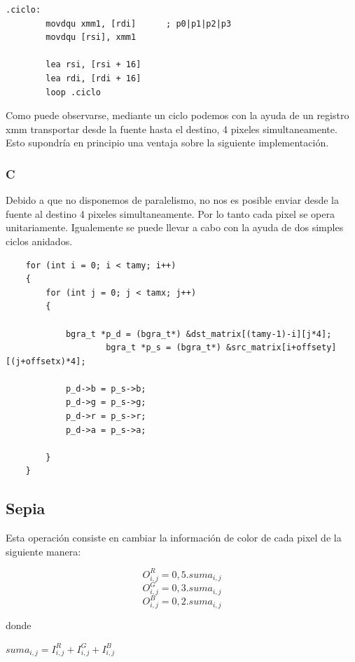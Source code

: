 \begin{codesnippet}
\begin{verbatim}
.ciclo:
        movdqu xmm1, [rdi]      ; p0|p1|p2|p3
        movdqu [rsi], xmm1
    
        lea rsi, [rsi + 16]
        lea rdi, [rdi + 16]
        loop .ciclo
\end{verbatim}
\end{codesnippet}

Como puede observarse, mediante un ciclo podemos con la ayuda de un registro xmm transportar desde la fuente hasta el destino, 4 pixeles simultaneamente. Esto supondría en principio una ventaja sobre la siguiente implementación.

\subsubsection{C}

Debido a que no disponemos de paralelismo, no nos es posible enviar desde la fuente al destino 4 pixeles simultaneamente. Por lo tanto cada pixel se opera unitariamente. Igualemente se puede llevar a cabo con la ayuda de dos simples ciclos anidados.

\begin{codesnippet}
\begin{verbatim}
	for (int i = 0; i < tamy; i++) 
	{
		for (int j = 0; j < tamx; j++) 
		{

			bgra_t *p_d = (bgra_t*) &dst_matrix[(tamy-1)-i][j*4];
            		bgra_t *p_s = (bgra_t*) &src_matrix[i+offsety][(j+offsetx)*4];

			p_d->b = p_s->b;
			p_d->g = p_s->g;
			p_d->r = p_s->r;
			p_d->a = p_s->a;

		}
	}
\end{verbatim}
\end{codesnippet}

\subsection{Sepia}
Esta operación consiste en cambiar la información de color de cada pixel de la siguiente manera:

\begin{center}
$$O_{i,j}^{R} = 0, 5 . suma_{i,j}$$
$$O_{i,j}^{G} = 0, 3 . suma_{i,j}$$
$$O_{i,j}^{B} = 0, 2 . suma_{i,j}$$
\end{center}

donde 

\begin{center}
$suma_{i,j} = I_{i,j}^{R} + I_{i,j}^{G} + I_{i,j}^{B}$
\end{center}

